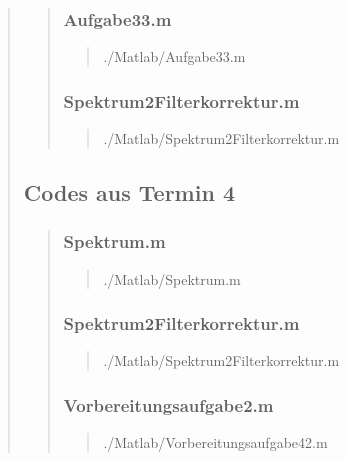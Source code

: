 \begin{quote}
\begin{quote}
        \subsubsection{Aufgabe33.m}
        \begin{quote}
            
                {./Matlab/Aufgabe33.m}
        \end{quote}
        
        \subsubsection{Spektrum2Filterkorrektur.m}
        \begin{quote}
            
                {./Matlab/Spektrum2Filterkorrektur.m}
        \end{quote}
	\end{quote}
	
	\subsection{Codes aus Termin 4}
	\begin{quote}
		
		\subsubsection{Spektrum.m}
		\begin{quote}
		
				{./Matlab/Spektrum.m}
		\end{quote}
		
		\subsubsection{Spektrum2Filterkorrektur.m}
        \begin{quote}
        
                {./Matlab/Spektrum2Filterkorrektur.m}
        \end{quote}
		
		\subsubsection{Vorbereitungsaufgabe2.m}
		\begin{quote}
		
		        {./Matlab/Vorbereitungsaufgabe42.m}
		\end{quote}
		

\end{quote}
\end{quote}
